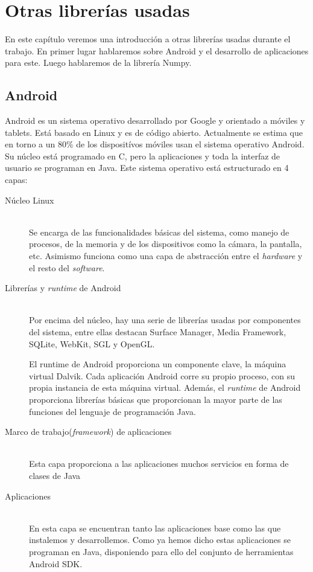 \documentclass[a4paper,openright, 12pt]{book}
\begin{document}
\chapter{Otras librerías usadas} \label{cap.otras}
En este capítulo veremos una introducción a otras librerías usadas durante el trabajo. En primer lugar hablaremos sobre Android y el desarrollo de aplicaciones para este. Luego hablaremos de la librería Numpy.
\section{Android}

Android es un sistema operativo desarrollado por Google y orientado a móviles y tablets. Está basado en Linux y es de código abierto. Actualmente se estima que en torno a un 80\% de los dispositívos móviles usan el sistema operativo Android.
Su núcleo está programado en C, pero la aplicaciones y toda la interfaz de usuario se programan en Java.
Este sistema operativo está estructurado en 4 capas:
\begin{description}
  \item[Núcleo Linux] \hfill \\
  Se encarga de las funcionalidades básicas del sistema, como manejo de procesos, de la memoria y de los dispositivos como la cámara, la pantalla, etc.
   Asimismo funciona como una capa de abstracción entre el \textit{hardware} y el resto del \textit{software}.
   
  \item[Librerías y \textit{runtime} de Android] \hfill \\
  Por encima del núcleo, hay una serie de librerías usadas por componentes del sistema, entre ellas destacan Surface Manager, Media Framework, SQLite, WebKit, SGL y OpenGL.

  El runtime de Android proporciona un componente clave, la máquina virtual Dalvik. Cada aplicación Android corre su propio proceso, con su propia instancia de esta máquina virtual.
  Además, el \textit{runtime} de Android proporciona librerías básicas que proporcionan la mayor parte de las funciones del lenguaje de programación Java.
  
  \item[Marco de trabajo(\textit{framework}) de aplicaciones] \hfill \\
  Esta capa proporciona a las aplicaciones muchos servicios en forma de clases de Java 
  
   \item[Aplicaciones] \hfill \\
  En esta capa se encuentran tanto las aplicaciones base como las que instalemos y desarrollemos. Como ya hemos dicho estas aplicaciones se programan en Java, disponiendo para ello del conjunto de herramientas Android SDK.
\end{description}
\end{document}
